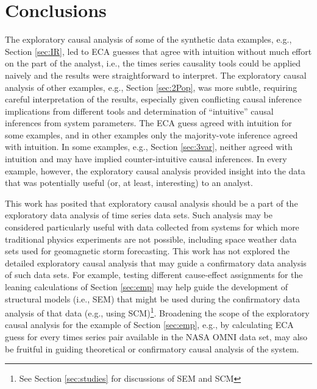 \documentclass{article}[10pt]
\begin{document}
\section{Conclusions}
The exploratory causal analysis of some of the synthetic data examples, e.g., Section \ref{sec:IR}, led to ECA guesses that agree with intuition without much effort on the part of the analyst, i.e., the times series causality tools could be applied naively and the results were straightforward to interpret.  The exploratory causal analysis of other examples, e.g., Section \ref{sec:2Pop}, was more subtle, requiring careful interpretation of the results, especially given conflicting causal inference implications from different tools and determination of ``intuitive'' causal inferences from system parameters.  The ECA guess agreed with intuition for some examples, and in other examples only the majority-vote inference agreed with intuition.  In some examples, e.g., Section \ref{sec:3var}, neither agreed with intuition and may have implied counter-intuitive causal inferences.  In every example, however, the exploratory causal analysis provided insight into the data that was potentially useful (or, at least, interesting) to an analyst.

This work has posited that exploratory causal analysis should be a part of the exploratory data analysis of time series data sets.  Such analysis may be considered particularly useful with data collected from systems for which more traditional physics experiments are not possible, including space weather data sets used for geomagnetic storm forecasting.  This work has not explored the detailed exploratory causal analysis that may guide a confirmatory data analysis of such data sets.  For example, testing different cause-effect assignments for the leaning calculations of Section \ref{sec:emp} may help guide the development of structural models (i.e., SEM) that might be used during the confirmatory data analysis of that data (e.g., using SCM)\footnote{See Section \ref{sec:studies} for discussions of SEM and SCM}.  Broadening the scope of the exploratory causal analysis for the example of Section \ref{sec:emp}, e.g., by calculating ECA guess for every times series pair available in the NASA OMNI data set, may also be fruitful in guiding theoretical or confirmatory causal analysis of the system.
\end{document}

